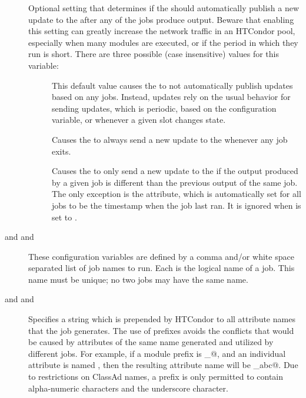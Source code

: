\begin{description}
\label{param:StartdCronAutopublish}
\item[\Macro{STARTD\_CRON\_AUTOPUBLISH}]
  Optional setting that determines if the  should
  automatically publish a new update to the  after
  any of the jobs produce output.
  Beware that enabling this setting can greatly increase the network
  traffic in an HTCondor pool, especially when many modules are
  executed, or if the period in which they run is short.
  There are three possible (case insensitive) values for this
  variable: 
  \begin{description}
     \item[] This default value causes the
      to not automatically publish updates based on
     any jobs. Instead, updates rely on the usual behavior for sending
     updates, which is periodic, based on the 
     configuration variable, or whenever a given slot changes state.
     \item[] Causes the  to always send a new
     update to the  whenever any job exits.
     \item[] Causes the  to only send a
     new update to the  if the output produced by a
     given job is different than the previous output of the
     same job.
     The only exception is the  attribute, 
     which is automatically set for all jobs to be the timestamp when
     the job last ran. It is ignored when
      is set to .
  \end{description}

\label{param:StartdCronJobList}
\label{param:ScheddCronJobList}
\label{param:BenchmarksJobList}
\item[\Macro{STARTD\_CRON\_JOBLIST} and \Macro{SCHEDD\_CRON\_JOBLIST}
  and \Macro{BENCHMARKS\_JOBLIST}]
  These configuration variables are defined by a comma and/or white space
  separated list of job names to run.  Each is the logical name of a job.
  This name must be unique; no two jobs may have the same name.

\label{param:StartdCronJobPrefix}
\label{param:ScheddCronJobPrefix}
\label{param:BenchmarksJobPrefix}
\item[\Macro{STARTD\_CRON\_<JobName>\_PREFIX} 
       and \Macro{SCHEDD\_CRON\_<JobName>\_PREFIX}
       and \Macro{BENCHMARKS\_<JobName>\_PREFIX}]
  Specifies a string which is prepended by
  HTCondor to all attribute names that the job generates.
  The use of prefixes avoids the conflicts that would be caused by
  attributes of the same name generated and utilized by different jobs.
  For example, if a module prefix is \verb@xyz_@,
  and an individual attribute is named \verb@abc@,
  then the resulting attribute name will be \verb@xyz_abc@.
  Due to restrictions on ClassAd names, a prefix is only permitted to contain
  alpha-numeric characters and the underscore character.


\end{description}
